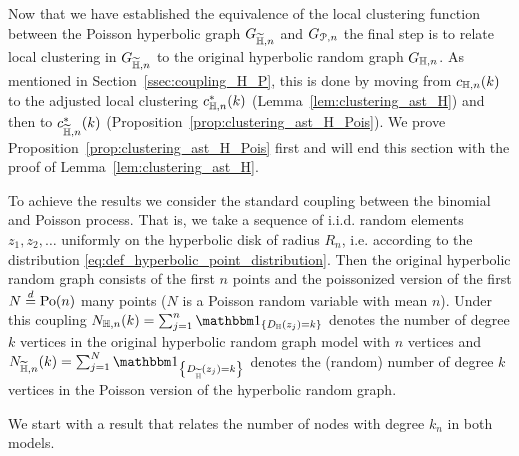 Now that we have established the equivalence of the local clustering function between the Poisson hyperbolic graph $G_{\widetilde{\mathbb{H}},n}$ and $G_{{\mathcal P},n}$ the final step is to relate local clustering in $G_{\widetilde{\mathbb{H}},n}$ to the original hyperbolic random graph $G_{\mathbb{H},n}$. As mentioned in Section~\ref{ssec:coupling_H_P}, this is done by moving from $c_{\mathbb{H},n}(k)$ to the adjusted local clustering $c_{\mathbb{H},n}^\ast(k)$ (Lemma~\ref{lem:clustering_ast_H}) and then to $c_{\widetilde{\mathbb{H}},n}^\ast(k)$ (Proposition~\ref{prop:clustering_ast_H_Pois}). We prove Proposition~\ref{prop:clustering_ast_H_Pois} first and will end this section with the proof of Lemma~\ref{lem:clustering_ast_H}.

To achieve the results we consider the standard coupling between the binomial and Poisson process. That is, we take a sequence of i.i.d. random elements $z_1, z_2, \dots$ uniformly on the hyperbolic disk of radius $R_n$, i.e. according to the distribution \eqref{eq:def_hyperbolic_point_distribution}. Then the original hyperbolic random graph consists of the first $n$ points and the poissonized version of the first $N \stackrel{d}{=} {\mathrm{Po}}(n)$ many points ($N$ is a Poisson random variable with mean $n$). Under this coupling $N_{\H,n}(k) = \sum_{j=1}^n \ind{D_\H(z_j)=k}$ denotes the number of degree $k$ vertices in the original hyperbolic random graph model with $n$ vertices and $N_{\HP,n}(k)=\sum_{j=1}^{N} \ind{D_{\HP}(z_j)=k}$ denotes the (random) number of degree $k$ vertices in the Poisson version of the hyperbolic random graph.

We start with a result that relates the number of nodes with degree $k_n$ in both models. 


